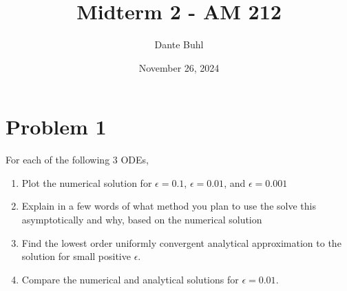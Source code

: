 \documentclass{article}
\begin{document}
\title{Midterm 2 - AM 212}
\author{Dante Buhl}
\date{November 26, 2024}


\newcommand{\wrms}{w_{\text{rms}}}
\newcommand{\bs}[1]{\boldsymbol{#1}}
\newcommand{\tb}[1]{\textbf{#1}}
\newcommand{\bmp}[1]{\begin{minipage}{#1\textwidth}}
\newcommand{\emp}{\end{minipage}}
\newcommand{\R}{\mathbb{R}}
\newcommand{\C}{\mathbb{C}}
\newcommand{\N}{\mathcal{N}}
\newcommand{\K}{\bs{\mathrm{K}}}
\newcommand{\m}{\bs{\mu}_*}
\newcommand{\s}{\bs{\Sigma}_*}
\newcommand{\dt}{\Delta t}
\newcommand{\dx}{\Delta x}
\newcommand{\tr}[1]{\text{Tr}(#1)}
\newcommand{\Tr}[1]{\text{Tr}(#1)}
\newcommand{\Div}{\nabla \cdot}
\renewcommand{\div}{\nabla \cdot}
\newcommand{\Curl}{\nabla \times}
\newcommand{\Grad}{\nabla}
\newcommand{\grad}{\nabla}
\newcommand{\grads}{\nabla_s}
\newcommand{\gradf}{\nabla_f}
\newcommand{\xs}{x_s}
\newcommand{\xf}{x_f}
\newcommand{\ts}{t_s}
\newcommand{\tf}{t_f}
\newcommand{\pt}{\partial t}
\newcommand{\pz}{\partial z}
\newcommand{\uvec}{\bs{u}}
\newcommand{\F}{\bs{F}}
\newcommand{\T}{\tilde{T}}
\newcommand{\ez}{\bs{e}_z}
\newcommand{\ex}{\bs{e}_x}
\newcommand{\ey}{\bs{e}_y}
\newcommand{\eo}{\bs{e}_{\bs{\Omega}}}
\newcommand{\ppt}[1]{\frac{\partial #1}{\partial t}}
\newcommand{\ppts}[1]{\frac{\partial #1}{\partial t_s}}
\newcommand{\pptf}[1]{\frac{\partial #1}{\partial t_f}}
\newcommand{\ppz}[1]{\frac{\partial #1}{\partial z}}
\newcommand{\ddz}[1]{\frac{d #1}{d z}}
\newcommand{\ppzetas}[1]{\frac{\partial^2 #1}{\partial \zeta^2}}
\newcommand{\ppzs}[1]{\frac{\partial #1}{\partial z_s}}
\newcommand{\ppzf}[1]{\frac{\partial #1}{\partial z_f}}
\newcommand{\ppx}[1]{\frac{\partial #1}{\partial x}}
\newcommand{\ppy}[1]{\frac{\partial #1}{\partial y}}
\newcommand{\ppzeta}[1]{\frac{\partial #1}{\partial \zeta}}


\maketitle 

\section*{Problem 1}
For each of the following 3 ODEs,
\begin{enumerate}[label=\alph*.]
    \item Plot the numerical solution for $\epsilon = 0.1$, $\epsilon = 0.01$,
    and $\epsilon = 0.001$
    \item Explain in a few words of what method you plan to use the solve this
    asymptotically and why, based on the numerical solution
    \item Find the lowest order uniformly convergent analytical approximation to
    the solution for small positive $\epsilon$. 
    \item Compare the numerical and analytical solutions for $\epsilon = 0.01$. 
\end{enumerate}
\end{document}
